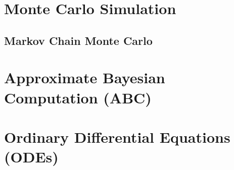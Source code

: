 \section{Monte Carlo Simulation}

\subsection{Markov Chain Monte Carlo}

\section{Approximate Bayesian Computation (ABC)}

\section{Ordinary Differential Equations (ODEs)}



